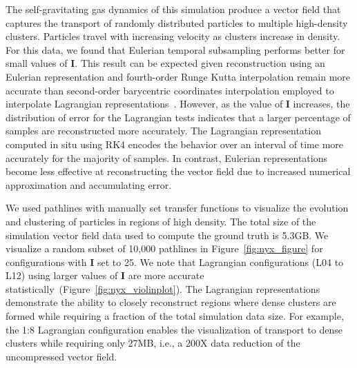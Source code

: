 The self-gravitating gas dynamics of this simulation produce a vector field that captures the transport of randomly distributed particles to multiple high-density clusters.
%
Particles travel with increasing velocity as clusters increase in density.
%
For this data, we found that Eulerian temporal subsampling performs better for small values of \textbf{I}.
%
This result can be expected given reconstruction using an Eulerian representation and fourth-order Runge Kutta interpolation remain more accurate than second-order barycentric coordinates interpolation employed to interpolate Lagrangian representations~\cite{bujack2015lagrangian}\cite{hummel2016error}.
%
%
However, as the value of \textbf{I} increases, the distribution of error for the Lagrangian tests indicates that a larger percentage of samples are reconstructed more accurately.
%
The Lagrangian representation computed in situ using RK4 encodes the behavior over an interval of time more accurately for the majority of samples.
%
In contrast, Eulerian representations become less effective at reconstructing the vector field due to increased numerical approximation and accumulating error.
%
%
%

We used pathlines with manually set transfer functions to visualize the evolution and clustering of particles in regions of high density.
%
The total size of the simulation vector field data used to compute the ground truth is 5.3GB.
%
We visualize a random subset of 10,000 pathlines in Figure~\ref{fig:nyx_figure} for configurations with \textbf{I} set to 25.
%
We note that Lagrangian configurations (L04 to L12) using larger values of \textbf{I} are more accurate statistically~(Figure~\ref{fig:nyx_violinplot}).
%
%
The Lagrangian representations demonstrate the ability to closely reconstruct regions where dense clusters are formed while requiring a fraction of the total simulation data size.
%
For example, the 1:8 Lagrangian configuration enables the visualization of transport to dense clusters while requiring only 27MB, i.e., a 200X data reduction of the uncompressed vector field.
%

